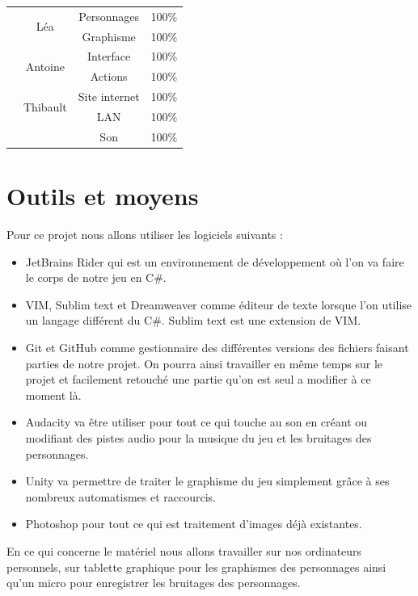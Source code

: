 \documentclass[12pt]{extarticle}
\begin{document}
\begin{table}[!ht]
\begin{center}
\begin{tabular}{ | c | c | c | c | }
			& \multirow{2}{*}{Léa} & Personnages & 100\% \\ \cline{3-4}
			&& Graphisme & 100\% \\ \cline{2-4}
			& \multirow{2}{*}{Antoine} & Interface & 100\% \\ \cline{3-4}
			&& Actions & 100\% \\ \cline{2-4}
			& \multirow{2}{*}{Thibault} & Site internet & 100\% \\ \cline{3-4}
			&& LAN & 100\% \\ \cline{3-4}
			&& Son & 100\% \\ \hline
		\end{tabular}
	\end{center}
\end{table}

\section{Outils et moyens}

Pour ce projet nous allons utiliser les logiciels suivants :
\begin{itemize}[label=\textbullet]
	\item JetBrains Rider qui est un environnement de développement où l'on va faire le corps de notre jeu en C\#.
	\item VIM, Sublim text et Dreamweaver comme éditeur de texte lorsque l'on utilise un langage différent du C\#. Sublim text est une extension de VIM.
	\item Git et GitHub comme gestionnaire des différentes versions des fichiers faisant parties de notre projet. On pourra ainsi travailler en même temps sur le projet et facilement retouché une partie qu'on est seul a modifier à ce moment là.
	\item Audacity va être utiliser pour tout ce qui touche au son en créant ou modifiant des pistes audio pour la musique du jeu et les bruitages des personnages.
	\item Unity va permettre de traiter le graphisme du jeu simplement grâce à ses nombreux automatismes et raccourcis.
	\item Photoshop pour tout ce qui est traitement d'images déjà existantes.
\end{itemize}

En ce qui concerne le matériel nous allons travailler sur nos ordinateurs personnels, sur tablette graphique pour les graphismes des personnages ainsi qu'un micro pour enregistrer les bruitages des personnages.
\end{document}
